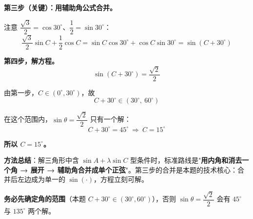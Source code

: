 \begin{answer}
\textbf{第三步（关键）：用辅助角公式合并。}

注意 $\dfrac{\sqrt3}2=\cos30^\circ$、$\dfrac12=\sin30^\circ$：
\nopagebreak[4]
\[\frac{\sqrt3}2\sin C+\frac12\cos C=\sin C\cos30^\circ+\cos C\sin30^\circ=\sin\left(C+30^\circ\right)\]

\textbf{第四步，解方程。}
\nopagebreak[4]
\[\sin\left(C+30^\circ\right)=\frac{\sqrt2}2\]

由第一步，$C\in\left(0^\circ,30^\circ\right)$，故
\nopagebreak[4]
\[C+30^\circ\in\left(30^\circ,\ 60^\circ\right)\]

在这个范围内，$\sin\theta=\dfrac{\sqrt2}2$ 只有一个解：
\nopagebreak[4]
\[C+30^\circ=45^\circ\ \Longrightarrow\ C=15^\circ\]

\textbf{所以 $C=15^\circ$。}

\begin{gktip}
\textbf{方法总结}：解三角形中含 $\sin A+\lambda\sin C$ 型条件时，标准路线是"\textbf{用内角和消去一个角 → 展开 → 辅助角合并成单个正弦}"。第三步的合并是本题的技术核心：合并后左边成为单一的 $\sin(\cdot)$，方程立刻可解。

\textbf{务必先确定角的范围}（本题 $C+30^\circ\in(30^\circ,60^\circ)$），否则 $\sin\theta=\dfrac{\sqrt2}2$ 会有 $45^\circ$ 与 $135^\circ$ 两个解。
\end{gktip}



\par\medskip

\end{answer}
